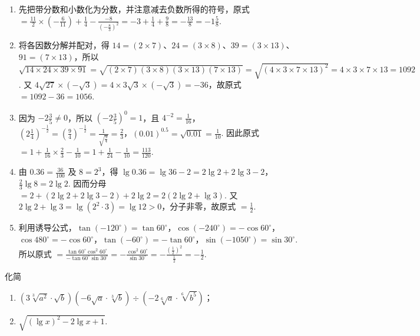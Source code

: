 \begin{solution}
\begin{enumerate}
    \item 先把带分数和小数化为分数，并注意减去负数所得的符号，原式 \(=\frac{11}{2}\times\left(-\frac{6}{11}\right)+\frac{1}{4}-\frac{-8}{\left(-\frac{8}{3}\right)^2}=-3+\frac{1}{4}+\frac{9}{8}=-\frac{13}{8}=-1\frac{5}{8}\).

    \item 将各因数分解并配对，得 \(14=(2\times7)\)、\(24=(3\times8)\)、\(39=(3\times13)\)、\(91=(7\times13)\)，所以
    \(\sqrt{14\times24\times39\times91}=\sqrt{(2\times7)(3\times8)(3\times13)(7\times13)}=\sqrt{(4\times3\times7\times13)^2}=4\times3\times7\times13=1092\). 又 \(4\sqrt{27}\times(-\sqrt3)=4\times3\sqrt3\times(-\sqrt3)=-36\)，故原式 \(=1092-36=1056\).

    \item 因为 \(-2\frac{3}{5}\neq0\)，所以 \(\left(-2\frac{3}{5}\right)^0=1\)，且 \(4^{-2}=\frac{1}{16}\)，\(\left(2\frac{1}{4}\right)^{-\frac12}=\left(\frac94\right)^{-\frac12}=\frac{1}{\sqrt{\frac{9}{4}}}=\frac23\)，\((0.01)^{0.5}=\sqrt{0.01}=\frac{1}{10}\). 因此原式 \(=1+\frac{1}{16}\times\frac23-\frac{1}{10}=1+\frac{1}{24}-\frac{1}{10}=\frac{113}{120}\).

    \item 由 \(0.36=\frac{36}{100}\) 及 \(8=2^3\)，得 \(\lg0.36=\lg36-2=2\lg2+2\lg3-2\)，\(\frac23\lg8=2\lg2\). 因而分母 \(=2+(2\lg2+2\lg3-2)+2\lg2=2(2\lg2+\lg3)\). 又 \(2\lg2+\lg3=\lg(2^2\cdot3)=\lg12>0\)，分子非零，故原式 \(=\frac{1}{2}\).

    \item 利用诱导公式，\(\tan(-120^\circ)=\tan60^\circ\)，\(\cos(-240^\circ)=-\cos60^\circ\)，\(\cos480^\circ=-\cos60^\circ\)，\(\tan(-60^\circ)=-\tan60^\circ\)，\(\sin(-1050^\circ)=\sin30^\circ\). 所以原式 \(=\frac{\tan60^\circ\cos^2 60^\circ}{-\tan60^\circ\sin30^\circ}=-\frac{\cos^2 60^\circ}{\sin30^\circ}=-\frac{(\frac{1}{2})^2}{\frac{1}{2}}=-\frac12\).
\end{enumerate}
\end{solution}

\begin{problem}
化简

\begin{enumerate}
    \item \(\left(3\sqrt[3]{a^2}\cdot\sqrt b\right)\left(-6\sqrt a\cdot\sqrt[3]b\right)\div\left(-2\sqrt[6]a\cdot\sqrt[6]{b^5}\right)\)；
    \item \(\sqrt{(\lg x)^2-2\lg x+1}\).
\end{enumerate}
\end{problem}

